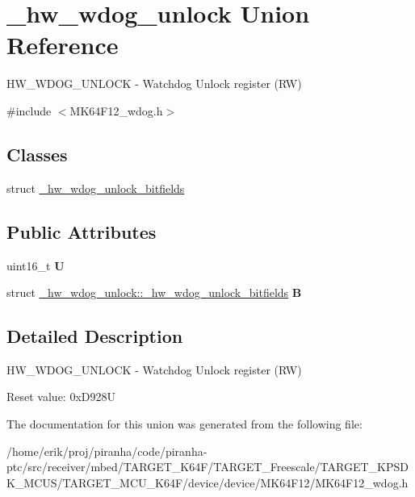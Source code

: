 \hypertarget{union__hw__wdog__unlock}{}\section{\+\_\+hw\+\_\+wdog\+\_\+unlock Union Reference}
\label{union__hw__wdog__unlock}


H\+W\+\_\+\+W\+D\+O\+G\+\_\+\+U\+N\+L\+O\+CK -\/ Watchdog Unlock register (RW)  




{\ttfamily \#include $<$M\+K64\+F12\+\_\+wdog.\+h$>$}

\subsection*{Classes}
\begin{DoxyCompactItemize}
\item 
struct \hyperlink{struct__hw__wdog__unlock_1_1__hw__wdog__unlock__bitfields}{\+\_\+hw\+\_\+wdog\+\_\+unlock\+\_\+bitfields}
\end{DoxyCompactItemize}
\subsection*{Public Attributes}
\begin{DoxyCompactItemize}
\item 
uint16\+\_\+t {\bfseries U}\hypertarget{union__hw__wdog__unlock_a2e2c7e903ddfaf62bdfe1bfff2673fc8}{}\label{union__hw__wdog__unlock_a2e2c7e903ddfaf62bdfe1bfff2673fc8}

\item 
struct \hyperlink{struct__hw__wdog__unlock_1_1__hw__wdog__unlock__bitfields}{\+\_\+hw\+\_\+wdog\+\_\+unlock\+::\+\_\+hw\+\_\+wdog\+\_\+unlock\+\_\+bitfields} {\bfseries B}\hypertarget{union__hw__wdog__unlock_a80a33720a3c5f0fc809507e3152cc344}{}\label{union__hw__wdog__unlock_a80a33720a3c5f0fc809507e3152cc344}

\end{DoxyCompactItemize}


\subsection{Detailed Description}
H\+W\+\_\+\+W\+D\+O\+G\+\_\+\+U\+N\+L\+O\+CK -\/ Watchdog Unlock register (RW) 

Reset value\+: 0x\+D928U 

The documentation for this union was generated from the following file\+:\begin{DoxyCompactItemize}
\item 
/home/erik/proj/piranha/code/piranha-\/ptc/src/receiver/mbed/\+T\+A\+R\+G\+E\+T\+\_\+\+K64\+F/\+T\+A\+R\+G\+E\+T\+\_\+\+Freescale/\+T\+A\+R\+G\+E\+T\+\_\+\+K\+P\+S\+D\+K\+\_\+\+M\+C\+U\+S/\+T\+A\+R\+G\+E\+T\+\_\+\+M\+C\+U\+\_\+\+K64\+F/device/device/\+M\+K64\+F12/M\+K64\+F12\+\_\+wdog.\+h\end{DoxyCompactItemize}
